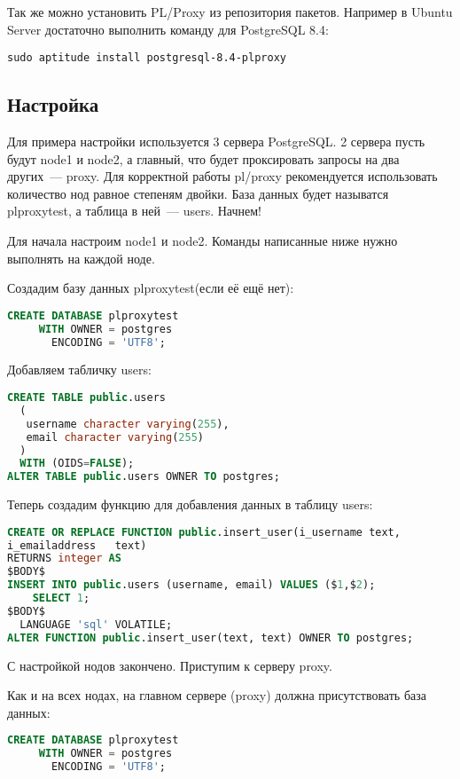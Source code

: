 Так же можно установить PL/Proxy из репозитория пакетов. 
Например в Ubuntu Server достаточно выполнить команду для PostgreSQL 8.4:
\begin{lstlisting}[label=lst:plproxy1,caption=Установка]
sudo aptitude install postgresql-8.4-plproxy
\end{lstlisting}

\subsection{Настройка}
Для примера настройки используется 3 сервера PostgreSQL. 2 сервера пусть будут node1 и node2, 
а главный, что будет проксировать запросы на два других~--- proxy.
Для корректной работы pl/proxy рекомендуется использовать количество нод равное степеням двойки. 
База данных будет называтся plproxytest, а таблица в ней~--- users. Начнем!

Для начала настроим node1 и node2. Команды написанные ниже нужно выполнять на каждой ноде.

Создадим базу данных plproxytest(если её ещё нет):
\begin{lstlisting}[language=SQL,label=lst:plproxy2,caption=Настройка]
CREATE DATABASE plproxytest
     WITH OWNER = postgres
       ENCODING = 'UTF8';
\end{lstlisting}

Добавляем табличку users:
\begin{lstlisting}[language=SQL,label=lst:plproxy3,caption=Настройка]
CREATE TABLE public.users
  (
   username character varying(255),
   email character varying(255)
  )
  WITH (OIDS=FALSE);
ALTER TABLE public.users OWNER TO postgres;
\end{lstlisting}
  
Теперь создадим функцию для добавления данных в таблицу users:
\begin{lstlisting}[language=SQL,label=lst:plproxy4,caption=Настройка]
CREATE OR REPLACE FUNCTION public.insert_user(i_username text, 
i_emailaddress   text)
RETURNS integer AS
$BODY$
INSERT INTO public.users (username, email) VALUES ($1,$2);
    SELECT 1;
$BODY$
  LANGUAGE 'sql' VOLATILE;
ALTER FUNCTION public.insert_user(text, text) OWNER TO postgres;
\end{lstlisting}

С настройкой нодов закончено. Приступим к серверу proxy.

Как и на всех нодах, на главном сервере (proxy) должна присутствовать база данных: 
\begin{lstlisting}[language=SQL,label=lst:plproxy5,caption=Настройка]
CREATE DATABASE plproxytest
     WITH OWNER = postgres
       ENCODING = 'UTF8';
\end{lstlisting}

